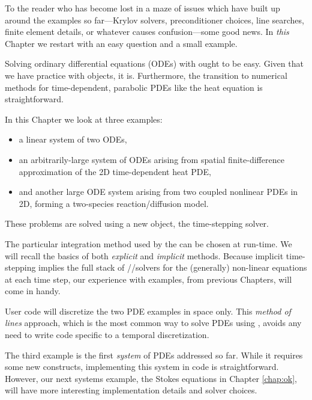 
To the reader who has become lost in a maze of issues which have built up around the examples so far---Krylov solvers, preconditioner choices, line searches, finite element details, or whatever causes confusion---some good news.  In \emph{this} Chapter we restart with an easy question and a small example.

Solving ordinary differential equations (ODEs) with \PETSc ought to be easy.  Given that we have practice with \PETSc objects, it is.  Furthermore, the transition to numerical methods for time-dependent, parabolic PDEs like the heat equation is straightforward.

In this Chapter we look at three examples:
\begin{itemize}
\item a linear system of two ODEs,
\item an arbitrarily-large system of ODEs arising from spatial finite-difference approximation of the 2D time-dependent heat PDE,
\item and another large ODE system arising from two coupled nonlinear PDEs in 2D, forming a two-species reaction/diffusion model.
\end{itemize}
These problems are solved using a new \PETSc object, the \pTS time-stepping solver.

The particular integration method used by the \pTS can be chosen at run-time.  We will recall the basics of both \emph{explicit} and \emph{implicit} methods.  Because implicit time-stepping implies the full stack of \pSNES/\pKSP/\pPC solvers for the (generally) non-linear equations at each time step, our experience with \pSNES examples, from previous Chapters, will come in handy.

User code will discretize the two PDE examples in space only.  This \emph{method of lines} approach, which is the most common way to solve PDEs using \PETSc \pTS, avoids any need to write code specific to a temporal discretization.

The third example is the first \emph{system} of PDEs addressed so far.  While it requires some new constructs, implementing this system in \PETSc code is straightforward.  However, our next systems example, the Stokes equations in Chapter \ref{chap:ok}, will have more interesting implementation details and solver choices.

